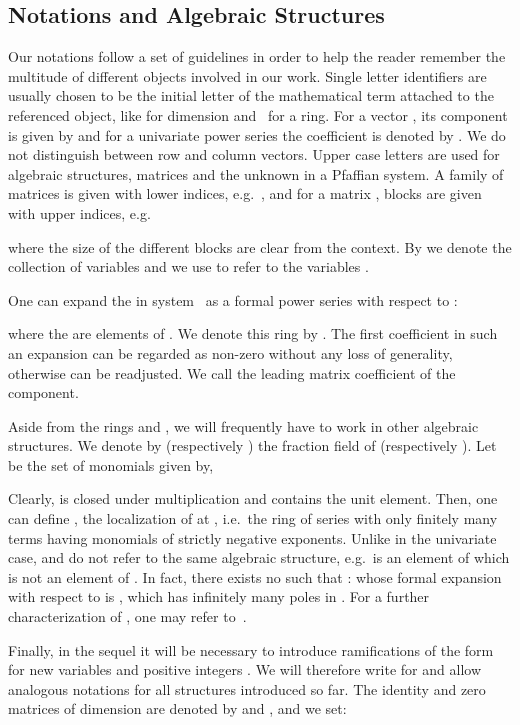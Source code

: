 \documentclass[final,1p,times,number,amsthm]{elsart}
\begin{document}
\subsection{Notations and Algebraic Structures}
Our notations follow a set of guidelines in order to help the reader remember
the multitude of different objects involved in our work. Single letter
identifiers are usually chosen to be the initial letter of the mathematical term
attached to the referenced object, like  for dimension and~ for a
ring. For a vector , its  component is given by  and for a
univariate power series  the  coefficient is denoted by . We do
not distinguish between row and column vectors. Upper case letters are used for
algebraic structures, matrices and the unknown in a Pfaffian system. A family of
matrices is given with lower indices, e.g.\ , and for a
matrix , blocks are given with upper indices, e.g.

where the size of the different blocks are clear from the context.
By  we denote the collection of variables  and we use
 to refer to the variables
.

One can expand the  in system~ as a formal power series with respect
to :

where the  are elements of . We denote this ring
by .  The first coefficient  in such an
expansion can be regarded as non-zero without any loss of generality, otherwise
 can be readjusted. We call  the leading matrix coefficient of the
 component.

Aside from the rings  and , we will frequently have
to work in other algebraic structures. We denote by
 (respectively ) the
fraction field of  (respectively ).  Let  be the set of
monomials given by,

Clearly,  is closed under multiplication and contains the unit element. Then,
one can define , the localization of  at
, i.e.\ the ring of series with only finitely many terms having monomials of
strictly negative exponents. Unlike in the univariate case,  and
 do not refer to the same algebraic structure, e.g.\ 
is an element of  which is not an element of . In fact, there
exists no  such that
:
 whose formal expansion with
respect to  is , which has infinitely
many poles in . For a further characterization of , one may refer
to~\cite{key3908}.


Finally, in the sequel it will be necessary to introduce ramifications of the
form  for new variables  and positive integers
. We will therefore write  for 
and allow analogous notations for all structures introduced so far. The identity
and zero matrices of dimension  are denoted by  and , and we set: 
 
\end{document}
